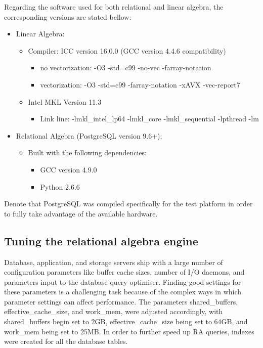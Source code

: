 Regarding the software used for both relational and linear algebra, the corresponding versions are stated bellow:

\begin{itemize}
\item Linear Algebra: 
    \begin{itemize}
    \item Compiler: ICC version 16.0.0 (GCC version 4.4.6 compatibility)
    \begin{itemize}
        \item no vectorization: -O3 -std=c99 -no-vec -farray-notation 
        \item vectorization: -O3 -std=c99 -farray-notation -xAVX -vec-report7
    \end{itemize}
    \item Intel\textsuperscript{\textregistered} MKL Version	11.3
    \begin{itemize}
        \item Link line: -lmkl\_intel\_lp64 -lmkl\_core -lmkl\_sequential -lpthread -lm
    \end{itemize}
        \end{itemize}

\vspace{0.35cm}
    \item Relational Algebra (PostgreSQL version 9.6+);
    \begin{itemize}
        \item Built with the following dependencies:
        \begin{itemize}
            \item GCC version 4.9.0
            \item Python 2.6.6
        \end{itemize}
           \end{itemize}
\end{itemize}

Denote that PostgreSQL was compiled specifically for the test platform in order to fully take advantage of the available hardware. 

\subsection{Tuning the relational algebra engine}
Database, application, and storage servers ship with a large number of configuration parameters like buffer cache sizes, number of I/O daemons, and parameters input to the database query optimiser. Finding good settings for these parameters is a challenging task because of the complex ways in which parameter settings can affect performance. The parameters shared\_buffers, effective\_cache\_size, and work\_mem, were adjusted accordingly, with  shared\_buffers begin set to 2GB, effective\_cache\_size being set to 64GB, and work\_mem being set to 25MB. In order to further speed up RA queries, indexes were created for all the database tables.


